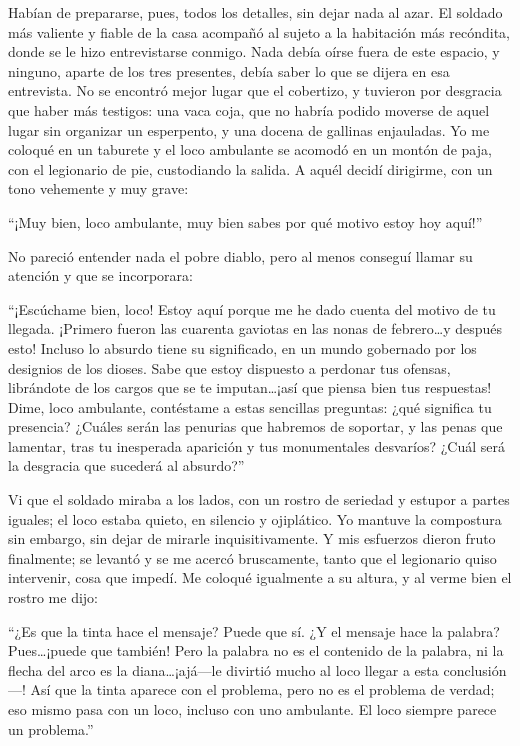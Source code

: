 \documentclass[11pt,openany]{book}
\begin{document}
Habían de prepararse, pues, todos los detalles, sin dejar nada al azar. El soldado más valiente y fiable de la casa acompañó al sujeto a la habitación más recóndita, donde se le hizo entrevistarse conmigo. Nada debía oírse fuera de este espacio, y ninguno, aparte de los tres presentes, debía saber lo que se dijera en esa entrevista. No se encontró mejor lugar que el cobertizo, y tuvieron por desgracia que haber más testigos: una vaca coja, que no habría podido moverse de aquel lugar sin organizar un esperpento, y una docena de gallinas enjauladas. Yo me coloqué en un taburete y el loco ambulante se acomodó en un montón de paja, con el legionario de pie, custodiando la salida. A aquél decidí dirigirme, con un tono vehemente y muy grave: 

“¡Muy bien, loco ambulante, muy bien sabes por qué motivo estoy hoy aquí!” 

No pareció entender nada el pobre diablo, pero al menos conseguí llamar su atención y que se incorporara: 

“¡Escúchame bien, loco! Estoy aquí porque me he dado cuenta del motivo de tu llegada. ¡Primero fueron las cuarenta gaviotas en las nonas de febrero\dots y después esto! Incluso lo absurdo tiene su significado, en un mundo gobernado por los designios de los dioses. Sabe que estoy dispuesto a perdonar tus ofensas, librándote de los cargos que se te imputan\dots ¡así que piensa bien tus respuestas! Dime, loco ambulante, contéstame a estas sencillas preguntas: ¿qué significa tu presencia? ¿Cuáles serán las penurias que habremos de soportar, y las penas que lamentar, tras tu inesperada aparición y tus monumentales desvaríos? ¿Cuál será la desgracia que sucederá al absurdo?” 

Vi que el soldado miraba a los lados, con un rostro de seriedad y estupor a partes iguales; el loco estaba quieto, en silencio y ojiplático. Yo mantuve la compostura sin embargo, sin dejar de mirarle inquisitivamente. Y mis esfuerzos dieron fruto finalmente; se levantó y se me acercó bruscamente, tanto que el legionario quiso intervenir, cosa que impedí. Me coloqué igualmente a su altura, y al verme bien el rostro me dijo: 

“¿Es que la tinta hace el mensaje? Puede que sí. ¿Y el mensaje hace la palabra? Pues\dots ¡puede que también! Pero la palabra no es el contenido de la palabra, ni la flecha del arco es la diana\dots ¡ajá—le divirtió mucho al loco llegar a esta conclusión—! Así que la tinta aparece con el problema, pero no es el problema de verdad; eso mismo pasa con un loco, incluso con uno ambulante. El loco siempre parece un problema.” 
\end{document}
